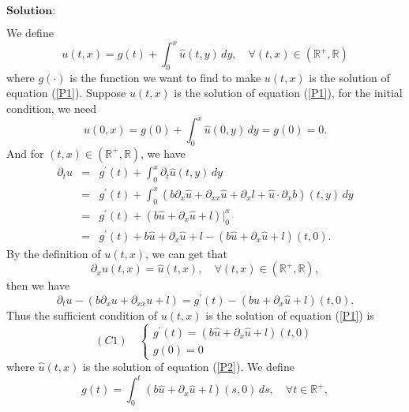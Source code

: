 \documentclass[12pt,a4paper]{ctexart}
\begin{document}
\vspace{8pt}

$\textbf{Solution:}$

We define
\begin{equation*}
    u(t, x) = g(t) + \int_{0}^{x} \hat u (t, y) \, d y, \quad \forall (t, x) \in (\mathbb{R}^{+}, \mathbb{R})
\end{equation*}
where $g(\cdot)$ is the function we want to find to make $u(t, x)$ is the solution of equation (\ref{P1}). Suppose $u(t, x)$ is the solution of equation (\ref{P1}), for the initial condition, we need
\begin{equation*}
    u(0, x) = g(0) + \int_{0}^{x} \hat u (0, y) \, d y = g(0) = 0.
\end{equation*}
And for $(t, x) \in (\mathbb{R}^{+}, \mathbb{R})$, we have
\begin{eqnarray*}
\partial_{t} u & = & g^{'} (t) + \int_{0}^{x} \partial_{t} \hat u(t, y) \, d y \\
& = & g^{'} (t) + \int_{0}^{x} (b \partial_{x} \hat u + \partial_{xx} \hat u + \partial_{x} l + \hat u \cdot \partial_{x} b ) (t, y) \, d y  \\
& = & g^{'} (t) + (b \hat u + \partial_{x} \hat u + l) |_{0}^{x}   \\
& = & g^{'} (t) + b \hat u + \partial_{x} \hat u + l - (b \hat u + \partial_{x} \hat u + l)(t, 0).
\end{eqnarray*}
By the definition of $u(t, x)$, we can get that
\begin{equation*}
    \partial_{x} u (t, x) = \hat u (t, x), \quad \forall (t, x) \in (\mathbb{R}^{+}, \mathbb{R}),
\end{equation*}
then we have
\begin{equation*}
    \partial_{t} u - (b \partial_{x} u + \partial_{xx} u + l) = g^{'}(t) - (b \hat u + \partial_{x} \hat u + l)(t, 0).
\end{equation*}
Thus the sufficient condition of $u(t, x)$ is the solution of equation (\ref{P1}) is
\begin{equation} \label{C1}
(C1) \quad
    \begin{cases}
    g^{'}(t) = (b \hat u + \partial_{x} \hat u + l)(t, 0) \\
    g(0) = 0
    \end{cases}
\end{equation}
where $\hat u(t, x)$ is the solution of equation (\ref{P2}). We define
\begin{equation}
    g(t) = \int_{0}^{t} (b \hat u + \partial_{x} \hat u + l)(s, 0) \, d s, \quad \forall t \in \mathbb{R}^{+},
\end{equation}
\end{document}
